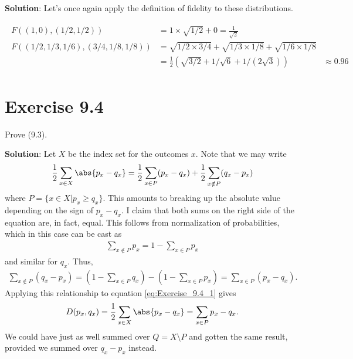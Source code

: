 \documentclass{book}
\begin{document}
    \textbf{Solution}: Let's once again apply the definition of fidelity to these distributions.
    
    \begin{align}
    \begin{aligned}
        F((1,0),(1/2,1/2)) &= 1\times \sqrt{1/2} + 0 = \frac{1}{\sqrt{2}} \\
        F((1/2,1/3,1/6),(3/4,1/8,1/8)) &= \sqrt{1/2\times 3/4} + \sqrt{1/3\times 1/8}+\sqrt{1/6\times 1/8} \\
        &= \frac{1}{2}(\sqrt{3/2} + 1/\sqrt{6}+1/(2\sqrt{3}))
        &\approx 0.96
    \end{aligned}
    \end{align}

\section*{Exercise 9.4}
    Prove (9.3).
    
    \textbf{Solution}: Let $X$ be the index set for the outcomes $x$. Note that we may write
    \begin{align} \label{eq:Exercise_9.4_1}
        \frac{1}{2}\sum_{x\in X} \abs{p_x-q_x} = \frac{1}{2}\sum_{x\in P} (p_x-q_x) + \frac{1}{2} \sum_{x\notin P} (q_x-p_x)
    \end{align}
    where $P = \{x\in X| p_x \geq q_x\}$. This amounts to breaking up the absolute value depending on the sign of $p_x-q_x$. I claim that both sums on the right side of the equation are, in fact, equal. This follows from normalization of probabilities, which in this case can be cast as 
    \begin{align}
        \sum_{x\notin P} p_x = 1-\sum_{x\in P} p_x
    \end{align}
    and similar for $q_x$. Thus,
    \begin{align}
        \sum_{x\notin P} (q_x-p_x) = (1-\sum_{x\in P}q_x) - (1-\sum_{x\in P}p_x) = \sum_{x\in P }(p_x - q_x).
    \end{align}
    Applying this relationship to equation \eqref{eq:Exercise_9.4_1} gives
    \begin{align}
        D(p_x, q_x) = \frac{1}{2}\sum_{x\in X} \abs{p_x-q_x} = \sum_{x\in P} p_x - q_x.
    \end{align}
    We could have just as well summed over $Q = X\setminus P$ and gotten the same result, provided we summed over $q_x-p_x$ instead. 
    
\end{document}

